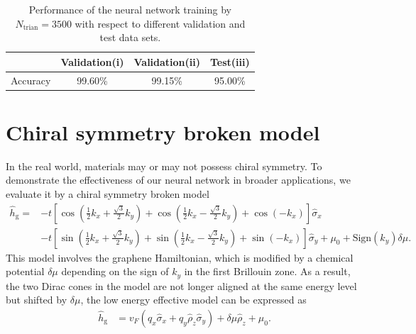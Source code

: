 \documentclass{article}
\begin{document}
\begin{table}[H]
    \centering
    \begin{tabular}{c|c|c|c}
        \toprule
             & Validation(i)  & Validation(ii) & Test(iii)   \\
        \midrule
        Accuracy     & 99.60\% & 99.15\% &  95.00\%  \\
        \bottomrule
    \end{tabular}
    \caption{Performance of the neural network training by $ N_{\textrm{trian}} = 3500  $ with respect to different validation and test data sets.}
    \label{tab:Performance}
\end{table}

\section{Chiral symmetry broken model}
In the real world, materials may or may not possess chiral symmetry.  To demonstrate the effectiveness of our neural network in broader applications, we evaluate it by a chiral symmetry broken model
\begin{align}
    \hat{h}_{\textrm{g}} = &-t \left[\cos(\frac{1}{2}k_x + \frac{\sqrt{3}}{2} k_y )+ \cos(\frac{1}{2}k_x - \frac{\sqrt{3}}{2} k_{y}  )+ \cos(-k_x)\right] \hat{\sigma}_x \nonumber\\
    &-t \left[\sin(\frac{1}{2}k_x + \frac{\sqrt{3}}{2} k_y )+ \sin(\frac{1}{2}k_x - \frac{\sqrt{3}}{2} k_y )+ \sin(-k_x)\right] \hat{\sigma}_y+\mu_0 + \textrm{Sign}(k_y)\delta \mu.
    \label{eq: Modified Graphene}
\end{align}
This model involves the graphene Hamiltonian, which is modified by a chemical potential $ \delta \mu $ depending on the sign of $ k_y $ in the first Brillouin zone. As a result, the two Dirac cones in the model are not longer aligned at the same energy level but shifted by $ \delta \mu $, the low energy effective model can be expressed as
\begin{align}
    \hat{h}_{\textrm{g}} &=   v_{F} \left( q_x \hat{\sigma}_x + q_y \hat{\rho}_z \hat{\sigma}_y \right) + \delta \mu \hat{\rho}_z + \mu_0.
\end{align}
\end{document}
